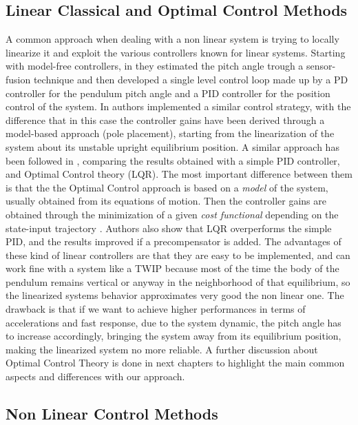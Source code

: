 \subsection{Linear Classical and Optimal Control Methods}
\label{subsec:Linear Classical and Control Methods}

A common approach when dealing with a non linear system is trying to locally linearize it and exploit the various controllers known for linear systems.
Starting with model-free controllers, in \cite{Hyung-Jik-Lee} they estimated the pitch angle trough a sensor-fusion technique and then developed a single level control loop made up by a PD controller for the pendulum pitch angle and a PID controller for the position control of the system.
In \cite{Purohit2021KinematicCO} authors implemented a similar control strategy, with the difference that in this case the controller gains have been derived through a model-based approach (pole placement), starting from the linearization of the system about its unstable upright equilibrium position.
A similar approach has been followed in \cite{Johnson-et-al, Babazadeh-et-al}, comparing the results obtained with a simple PID controller, and Optimal Control theory (LQR).
The most important difference between them is that the the Optimal Control approach is based on a \textit{model} of the system, usually obtained from its equations of motion.
Then the controller gains are obtained through the minimization of a given \textit{cost functional} depending on the state-input trajectory \cite{Liberzon-calculus-of-var}.
Authors also show that LQR overperforms the simple PID, and the results improved if a precompensator is added.
The advantages of these kind of linear controllers are that they are easy to be implemented, and can work fine with a system like a TWIP because most of the time the body of the pendulum remains vertical or anyway in the neighborhood of that equilibrium, so the linearized systems behavior approximates very good the non linear one.
The drawback is that if we want to achieve higher performances in terms of accelerations and fast response, due to the system dynamic, the pitch angle has to increase accordingly, bringing the system away from its equilibrium position, making the linearized system no more reliable.
A further discussion about Optimal Control Theory is done in next chapters to highlight the main common aspects and differences with our approach.

\subsection{Non Linear Control Methods}
\label{subsec:Non Linear Control Methods}

